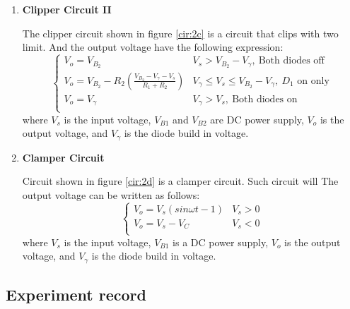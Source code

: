 \begin{enumerate}[a]
            \item \textbf{Clipper Circuit II}\par
                The clipper circuit shown in figure \ref{cir:2c} is a circuit that clips with two limit. And the output voltage have the following expression:
                \begin{equation}
                    \begin{cases}
                        V_o = V_{B_2} & V_s > V_{B_2} - V_\gamma,~\text{Both diodes off}\\
                        V_o = V_{B_2} - R_2(\frac{V_{B_2}-V_\gamma-V_s}{R_1+R_2}) & V_\gamma \le V_s \le V_{B_2} - V_\gamma,~\text{$D_1$ on only}\\
                        V_o = V_\gamma & V_\gamma > V_s,~\text{Both diodes on}\\
                    \end{cases}
                \label{eq:2clip2}
                \end{equation}
                where $V_s$ is the input voltage, $V_{B1}$ and $V_{B2}$ are DC power supply, $V_o$ is the output voltage, and $V_\gamma$ is the diode build in voltage.
                
            \item \textbf{Clamper Circuit}\par
                Circuit shown in figure \ref{cir:2d} is a clamper circuit. Such circuit will
                The output voltage can be written as follows:
                \begin{equation}
                    \begin{cases}
                        V_o = V_s(sin\omega t-1) & V_s > 0\\
                        V_o = V_s - V_C & V_s < 0\\
                    \end{cases}
                \label{eq:2clam}
                \end{equation}
                where $V_s$ is the input voltage, $V_{B1}$ is a DC power supply, $V_o$ is the output voltage, and $V_\gamma$ is the diode build in voltage.
        \end{enumerate}

\subsection{Experiment record}
